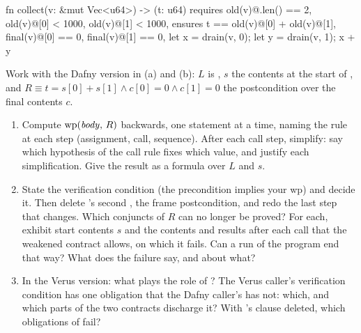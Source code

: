 \documentclass[11pt]{article}
\begin{document}
\begin{problem}
\begin{veruscode}
fn collect(v: &mut Vec<u64>) -> (t: u64)
    requires
        old(v)@.len() == 2,
        old(v)@[0] < 1000,
        old(v)@[1] < 1000,
    ensures
        t == old(v)@[0] + old(v)@[1],
        final(v)@[0] == 0,
        final(v)@[1] == 0,
{
    let x = drain(v, 0);
    let y = drain(v, 1);
    x + y
}
\end{veruscode}
Work with the Dafny version in (a) and (b): $L$ is , $s$ the
contents at the start of , and $R \equiv t = s[0] + s[1] \wedge
c[0] = 0 \wedge c[1] = 0$ the postcondition over the final contents $c$.
\begin{enumerate}
\item[(a)] Compute $\mathrm{wp}(\mathit{body},\,R)$ backwards, one statement at a time,
  naming the rule at each step (assignment, call, sequence). After each call
  step, simplify: say which hypothesis of the call rule fixes which value, and
  justify each simplification. Give the result as a formula over $L$ and $s$.
\item[(b)] State the verification condition (the precondition implies your
  wp) and decide it. Then delete 's second , the frame
  postcondition, and redo the last step that changes. Which conjuncts of $R$
  can no longer be proved? For each, exhibit start contents $s$ and the
  contents and results after each call that the weakened contract allows, on
  which it fails. Can a run of the program end that way? What does the
  failure say, and about what?
\item[(c)] In the Verus version: what plays the role of ? The
  Verus caller's verification condition has one obligation that the Dafny
  caller's has not: which, and which parts of the two contracts discharge it?
  With 's  clause deleted, which obligations of
   fail?
\end{enumerate}
\end{problem}
\end{document}
